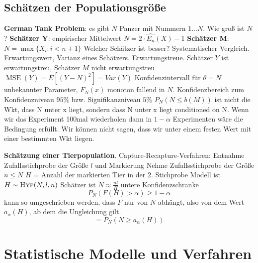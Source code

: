 \subsection{Schätzen der Populationsgröße}
\begin{outline}
\1 \textbf{German Tank Problem}: es gibt $N$ Panzer mit Nummern $1...N$. Wie groß ist $N$?
    \2 \textbf{Schätzer Y}: empirischer Mittelwert $N=2\cdot \hat{E_n}(X)-1$
    \2 \textbf{Schätzer M}: $N=\max \{ X_i : i < n+1 \}$
\1 Welcher Schätzer ist besser? Systematischer Vergleich.
    \2 Erwartungswert, Varianz eines Schätzers. Erwartungstreue.
        \3 Schätzer $Y$ ist erwartungstreu, Schätzer $M$ nicht erwartungstreu
        \3 $\operatorname{MSE}(Y)=E[(Y-N)^2]=Var(Y)$
    \2 Konfidenzintervall für $\theta = N$ unbekannter Parameter, $F_N(x)$ monoton fallend in $N$.
        \3 Konfidenzbereich zum Konfidenzniveau $95 \%$ bzw. Signifikanzniveau $5 \%$
        \3 $P_N(N \leq b(M))$ ist nicht die Wkt, dass N unter x liegt, sondern dass N unter x liegt conditioned on N. 
        \3 Wenn wir das Experiment 100mal wiederholen dann in $1-\alpha$ Experimenten wäre die Bedingung erfüllt. Wir können nicht sagen, dass wir unter einem festen Wert mit einer bestimmten Wkt liegen.
\end{outline}

\begin{outline}
\1 \textbf{Schätzung einer Tierpopulation}. Capture-Recapture-Verfahren:
    \2[1.] Entnahme Zufallsstichprobe der Größe $l$ und Markierung 
    \2[2.] Nehme Zufallsstichprobe der Größe $n\leq N$
        \3 $H$ = Anzahl der markierten Tier in der 2. Stichprobe
        \3 Modell ist $H\sim\textsc{Hyp}(N,l,n)$
        \3 Schätzer ist $N \approx \frac{nl}{H}$
        \3 untere Konfidenzschranke $$P_N(F(H)>\alpha)\geq 1- \alpha$$
        kann so umgeschrieben werden, dass $F$ nur von $N$ abhängt, also von dem Wert $a_\alpha(H)$, ab dem die Ungleichung gilt.
        $$=P_N(N\geq a_\alpha(H))$$
\end{outline}

\newpage 

\section{Statistische Modelle und Verfahren}

